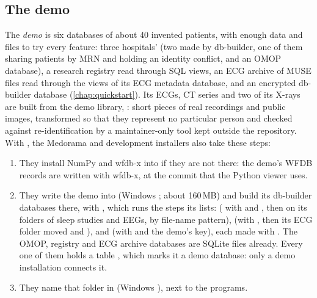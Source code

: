 \subsection{The demo}
\label{sec:installation-demo}

The \emph{demo} is six databases of about 40 invented patients, with enough data and files to
try every feature: three hospitals' (two made by db-builder, one of them sharing patients by MRN
and holding an identity conflict, and an OMOP database), a research registry read through SQL
views, an ECG archive of MUSE files read through the views of its ECG metadata database, and an
encrypted db-builder database (\cref{chap:quickstart}). Its ECGs, CT series and
two of its X-rays are built from the demo library, : short pieces of
real recordings and public images, transformed so that they represent no particular person and
checked against re-identification by a maintainer-only tool kept outside the repository.
With , the Medorama and development installers also take these steps:
\begin{enumerate}
\item They install NumPy and wfdb-x into  if they are not there: the demo's WFDB
  records are written with wfdb-x, at the commit that the Python viewer uses.
\item They write the demo into  (Windows
  ; about 160\,MB) and
  build its db-builder databases there, with , which runs the steps its  lists: 
  ( with  and , then
   on its folders of sleep studies and EEGs, by file-name pattern),
   (with , then its ECG folder moved and
  ), and  (with  and the
  demo's key), each made with . The OMOP, registry and ECG archive
  databases are SQLite files already. Every one of them holds a table , which
  marks it a demo database: only a demo installation connects it.
\item They name that folder in  (Windows
  ), next to the programs.
\end{enumerate}
